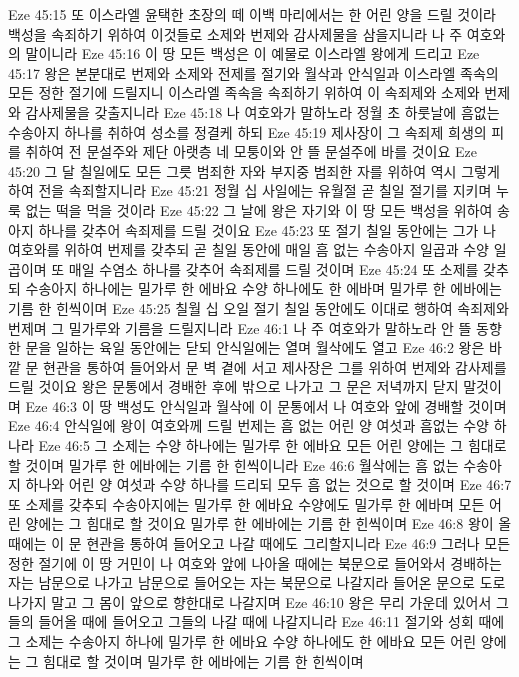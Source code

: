 Eze 45:15  또 이스라엘 윤택한 초장의 떼 이백 마리에서는 한 어린 양을 드릴 것이라 백성을 속죄하기 위하여 이것들로 소제와 번제와 감사제물을 삼을지니라 나 주 여호와의 말이니라
Eze 45:16  이 땅 모든 백성은 이 예물로 이스라엘 왕에게 드리고
Eze 45:17  왕은 본분대로 번제와 소제와 전제를 절기와 월삭과 안식일과 이스라엘 족속의 모든 정한 절기에 드릴지니 이스라엘 족속을 속죄하기 위하여 이 속죄제와 소제와 번제와 감사제물을 갖출지니라
Eze 45:18  나 여호와가 말하노라 정월 초 하룻날에 흠없는 수송아지 하나를 취하여 성소를 정결케 하되
Eze 45:19  제사장이 그 속죄제 희생의 피를 취하여 전 문설주와 제단 아랫층 네 모퉁이와 안 뜰 문설주에 바를 것이요
Eze 45:20  그 달 칠일에도 모든 그릇 범죄한 자와 부지중 범죄한 자를 위하여 역시 그렇게 하여 전을 속죄할지니라
Eze 45:21  정월 십 사일에는 유월절 곧 칠일 절기를 지키며 누룩 없는 떡을 먹을 것이라
Eze 45:22  그 날에 왕은 자기와 이 땅 모든 백성을 위하여 송아지 하나를 갖추어 속죄제를 드릴 것이요
Eze 45:23  또 절기 칠일 동안에는 그가 나 여호와를 위하여 번제를 갖추되 곧 칠일 동안에 매일 흠 없는 수송아지 일곱과 수양 일곱이며 또 매일 수염소 하나를 갖추어 속죄제를 드릴 것이며
Eze 45:24  또 소제를 갖추되 수송아지 하나에는 밀가루 한 에바요 수양 하나에도 한 에바며 밀가루 한 에바에는 기름 한 힌씩이며
Eze 45:25  칠월 십 오일 절기 칠일 동안에도 이대로 행하여 속죄제와 번제며 그 밀가루와 기름을 드릴지니라
Eze 46:1  나 주 여호와가 말하노라 안 뜰 동향한 문을 일하는 육일 동안에는 닫되 안식일에는 열며 월삭에도 열고
Eze 46:2  왕은 바깥 문 현관을 통하여 들어와서 문 벽 곁에 서고 제사장은 그를 위하여 번제와 감사제를 드릴 것이요 왕은 문통에서 경배한 후에 밖으로 나가고 그 문은 저녁까지 닫지 말것이며
Eze 46:3  이 땅 백성도 안식일과 월삭에 이 문통에서 나 여호와 앞에 경배할 것이며
Eze 46:4  안식일에 왕이 여호와께 드릴 번제는 흠 없는 어린 양 여섯과 흠없는 수양 하나라
Eze 46:5  그 소제는 수양 하나에는 밀가루 한 에바요 모든 어린 양에는 그 힘대로 할 것이며 밀가루 한 에바에는 기름 한 힌씩이니라
Eze 46:6  월삭에는 흠 없는 수송아지 하나와 어린 양 여섯과 수양 하나를 드리되 모두 흠 없는 것으로 할 것이며
Eze 46:7  또 소제를 갖추되 수송아지에는 밀가루 한 에바요 수양에도 밀가루 한 에바며 모든 어린 양에는 그 힘대로 할 것이요 밀가루 한 에바에는 기름 한 힌씩이며
Eze 46:8  왕이 올 때에는 이 문 현관을 통하여 들어오고 나갈 때에도 그리할지니라
Eze 46:9  그러나 모든 정한 절기에 이 땅 거민이 나 여호와 앞에 나아올 때에는 북문으로 들어와서 경배하는 자는 남문으로 나가고 남문으로 들어오는 자는 북문으로 나갈지라 들어온 문으로 도로 나가지 말고 그 몸이 앞으로 향한대로 나갈지며
Eze 46:10  왕은 무리 가운데 있어서 그들의 들어올 때에 들어오고 그들의 나갈 때에 나갈지니라
Eze 46:11  절기와 성회 때에 그 소제는 수송아지 하나에 밀가루 한 에바요 수양 하나에도 한 에바요 모든 어린 양에는 그 힘대로 할 것이며 밀가루 한 에바에는 기름 한 힌씩이며
